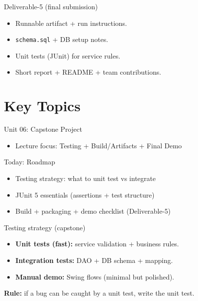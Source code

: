 \documentclass{beamer}
\begin{document}
\begin{frame}{Deliverable-5 (final submission)}
  \begin{itemize}[<+->]
    \item Runnable artifact + run instructions.
    \item \texttt{schema.sql} + DB setup notes.
    \item Unit tests (JUnit) for service rules.
    \item Short report + README + team contributions.
  \end{itemize}
  \slidesources{\OOPSUnitVISources}
\end{frame}

\section{Key Topics}
\label{sec:concepts}

\begin{frame}{Unit 06: Capstone Project}
  \begin{itemize}[<+->]
    \item Lecture focus: Testing + Build/Artifacts + Final Demo
  \end{itemize}
  \slidesources{\OOPSUnitVISources}
\end{frame}

\begin{frame}{Today: Roadmap}
  \begin{itemize}[<+->]
    \item Testing strategy: what to unit test vs integrate
    \item JUnit 5 essentials (assertions + test structure)
    \item Build + packaging + demo checklist (Deliverable-5)
  \end{itemize}
  \slidesources{\OOPSUnitVISources}
\end{frame}

\begin{frame}{Testing strategy (capstone)}
  \begin{itemize}[<+->]
    \item \textbf{Unit tests (fast):} service validation + business rules.
    \item \textbf{Integration tests:} DAO + DB schema + mapping.
    \item \textbf{Manual demo:} Swing flows (minimal but polished).
  \end{itemize}
  \textbf{Rule:} if a bug can be caught by a unit test, write the unit test.
  \slidesources{\OOPSUnitVISources}
\end{frame}
\end{document}
